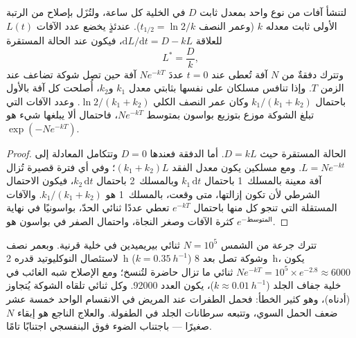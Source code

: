 \begin{theorem}\label{thm:b3:dna-repair:load}
لتنشأ آفات من نوع واحد بمعدل ثابت $D$ في الخلية كل
ساعة، ولتُزَل بإصلاح من الرتبة الأولى ثابت معدله $k$
(وعمر النصف $t_{1/2} = \ln 2/k$). عندئذٍ يخضع عدد الآفات $L(t)$ للعلاقة
$\mathrm{d}L/\mathrm{d}t = D - kL$، فيكون عند الحالة المستقرة
\[
L^{*} = \frac{D}{k},
\]
وتترك دفقةٌ من $N$ آفة تُعطى عند $t = 0$ عددَ $N e^{-kT}$
آفة حين تصل شوكة تضاعف عند الزمن $T$. وإذا تنافس مسلكان
على  نفسها بثابتي معدل $k_{1}$ و$k_{2}$،
أُصلحت كل آفة بالأول باحتمال $k_{1}/(k_{1} +
k_{2})$ وكان عمر النصف الكلي $\ln 2/(k_{1} + k_{2})$. وعدد
الآفات التي تبلغ الشوكة موزع بتوزيع بواسون بمتوسط
$N e^{-kT}$، فاحتمال ألا يبلغها شيء هو $\exp(-N e^{-kT})$.
\end{theorem}
\begin{proof}
الحالة المستقرة حيث $D = kL$. أما الدفقة فعندها $D = 0$ وتتكامل
المعادلة إلى $L = N e^{-kt}$. ومع مسلكين يكون معدل
الفقد $(k_{1} + k_{2})L$؛ وفي أي فترة قصيرة تُزال آفة معينة
بالمسلك~1 باحتمال $k_{1}\,\mathrm{d}t$ وبالمسلك~2
باحتمال $k_{2}\,\mathrm{d}t$، فيكون الاحتمال الشرطي
لأن تكون إزالتها، متى وقعت، بالمسلك~1 هو $k_{1}/(k_{1} +
k_{2})$. والآفات المستقلة التي تنجو كل منها باحتمال $e^{-kT}$
تعطي عددًا ثنائي الحدّ، بواسونيًا في نهاية كثرة الآفات وصغر
النجاة، واحتمال الصفر في بواسون هو $e^{-\text{المتوسط}}$.
\end{proof}

\begin{example}\label{ex:b3:dna-repair:xp}
تترك جرعة من الشمس $N = 10^{5}$ ثنائي بيريميدين في خلية قرنية.
وبعمر نصف لاستئصال النوكليوتيد قدره \qty{2}{h} ($k =
\qty{0.35}{h^{-1}}$) وشوكة تصل بعد \qty{8}{h}، يكون $N e^{-kT} =
10^{5}\times e^{-2.8} \approx 6000$ ثنائي ما تزال حاضرة لتُنسخ؛
ومع الإصلاح شبه الغائب في خلية جفاف الجلد ($k \approx
\qty{0.01}{h^{-1}}$)، يكون العدد \num{92000}. وكل ثنائي تلقاه الشوكة
يُتجاوز  (أدناه)، وهو كثير الخطأ: فحمل الطفرات
عند المريض في الانقسام الواحد خمسة عشر ضعف الحمل السوي، وتتبعه
سرطانات الجلد في الطفولة. والعلاج الناجع هو إبقاء $N$ صغيرًا ---
باجتناب الضوء فوق البنفسجي اجتنابًا تامًا.
\end{example}

